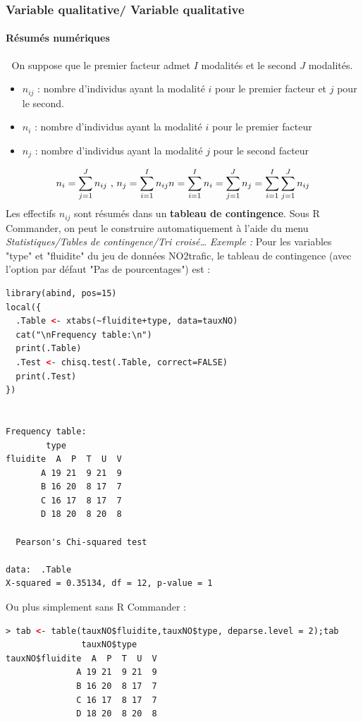 \subsubsection{Variable qualitative/ Variable qualitative}
\paragraph{Résumés numériques}\textcolor{white}{.}\newline
On suppose que le premier facteur admet $I$ modalités et le second $J$ modalités.
\begin{itemize}
\item $n_{ij}$ : nombre d'individus ayant la modalité $i$ pour le premier facteur et $j$ pour le second.
\item $n_{i}$ : nombre d'individus ayant la modalité $i$ pour le premier facteur
\item $n_{j}$ : nombre d'individus ayant la modalité $j$ pour le second facteur
\end{itemize}
$$n_{i} = \sum_{j=1}^{J} n_{ij}\textrm{ , } n_{j} = \sum_{i=1}^{I} n_{ij}\\
n = \sum_{i=1}^{I} n_{i} = \sum_{j=1}^{J} n_{j} = \sum_{i=1}^{I}\sum_{j=1}^{J} n_{ij}$$
Les effectifs $n_{ij}$ sont résumés dans un \textbf{tableau de contingence}.\newline
Sous R Commander, on peut le construire automatiquement à l'aide du menu \textit{Statistiques/Tables de contingence/Tri croisé\dots}\newline
\textit{Exemple : } Pour les variables "type" et "fluidite" du jeu de données NO2trafic, le tableau de contingence (avec l'option par défaut "Pas de pourcentages") est :
\begin{lstlisting}[language=html]
library(abind, pos=15)
local({
  .Table <- xtabs(~fluidite+type, data=tauxNO)
  cat("\nFrequency table:\n")
  print(.Table)
  .Test <- chisq.test(.Table, correct=FALSE)
  print(.Test)
})


Frequency table:
        type
fluidite  A  P  T  U  V
       A 19 21  9 21  9
       B 16 20  8 17  7
       C 16 17  8 17  7
       D 18 20  8 20  8

  Pearson's Chi-squared test

data:  .Table
X-squared = 0.35134, df = 12, p-value = 1
\end{lstlisting}
Ou plus simplement sans R Commander : 
\begin{lstlisting}[language=html]
> tab <- table(tauxNO$fluidite,tauxNO$type, deparse.level = 2);tab
               tauxNO$type
tauxNO$fluidite  A  P  T  U  V
              A 19 21  9 21  9
              B 16 20  8 17  7
              C 16 17  8 17  7
              D 18 20  8 20  8
\end{lstlisting}
